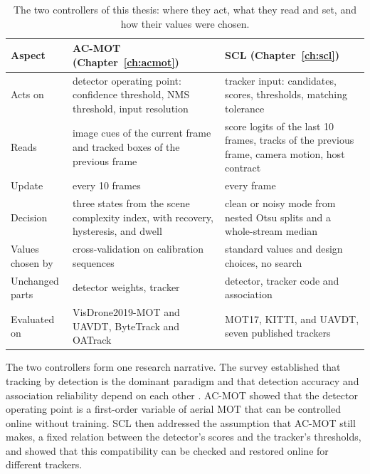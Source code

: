 \begin{table}[tbp]
\centering
\caption{The two controllers of this thesis: where they act, what they read and set, and how their values were chosen.}
\label{tab:intro-controllers}
\begin{tabular}{>{\raggedright\arraybackslash}p{2.9cm}>{\raggedright\arraybackslash}p{5.5cm}>{\raggedright\arraybackslash}p{5.5cm}}
\toprule
Aspect & AC-MOT (Chapter~\ref{ch:acmot}) & SCL (Chapter~\ref{ch:scl})\\
\midrule
Acts on & detector operating point: confidence threshold, NMS threshold, input resolution & tracker input: candidates, scores, thresholds, matching tolerance\\
Reads & image cues of the current frame and tracked boxes of the previous frame & score logits of the last 10 frames, tracks of the previous frame, camera motion, host contract\\
Update & every 10 frames & every frame\\
Decision & three states from the scene complexity index, with recovery, hysteresis, and dwell & clean or noisy mode from nested Otsu splits and a whole-stream median\\
Values chosen by & cross-validation on calibration sequences & standard values and design choices, no search\\
Unchanged parts & detector weights, tracker & detector, tracker code and association\\
Evaluated on & VisDrone2019-MOT and UAVDT, ByteTrack and OATrack & MOT17, KITTI, and UAVDT, seven published trackers\\
\bottomrule
\end{tabular}
\end{table}

The two controllers form one research narrative. The survey established that tracking by detection is the dominant paradigm and that detection accuracy and association reliability depend on each other \cite{ismail2026realtime}. AC-MOT showed that the detector operating point is a first-order variable of aerial MOT that can be controlled online without training. SCL then addressed the assumption that AC-MOT still makes, a fixed relation between the detector's scores and the tracker's thresholds, and showed that this compatibility can be checked and restored online for different trackers.

